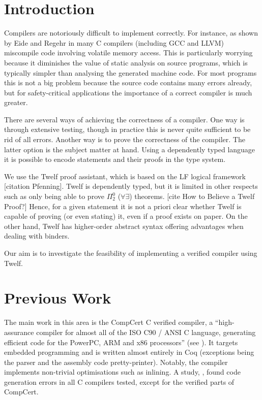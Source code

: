 \section{Introduction}
Compilers are notoriously difficult to implement correctly.
For instance, as shown by Eide and Regehr in \cite{EideRegehr08} many C compilers (including GCC and LLVM) miscompile code involving volatile memory access.
This is particularly worrying because it diminishes the value of static analysis on source programs, which is typically simpler than analysing the generated machine code.
For most programs this is not a big problem because the source code contains many errors already, but for safety-critical applications the importance of a correct compiler is much greater.

There are several ways of achieving the correctness of a compiler.
One way is through extensive testing, though in practice this is never quite sufficient to be rid of all errors.
Another way is to prove the correctness of the compiler.
The latter option is the subject matter at hand.
Using a dependently typed language it is possible to encode statements and their proofs in the type system.

We use the Twelf proof assistant, which is based on the LF logical framework [citation Pfenning].
Twelf is dependently typed, but it is limited in other respects such as only being able to prove $\Pi_2^0$ ($\forall \exists$) theorems. [cite How to Believe a Twelf Proof?]
Hence, for a given statement it is not a priori clear whether Twelf is capable of proving (or even stating) it, even if a proof exists on paper.
On the other hand, Twelf has higher-order abstract syntax offering advantages when dealing with binders.

Our aim is to investigate the feasibility of implementing a verified compiler using Twelf.


\section{Previous Work}

The main work in this area is the CompCert C verified compiler, a ``high-assurance compiler for almost all of the ISO C90 / ANSI C language, generating efficient code for the PowerPC, ARM and x86 processors'' (see \cite{CompCert16}).
It targets embedded programming and is written almost entirely in Coq (exceptions being the parser and the assembly code pretty-printer).
Notably, the compiler implements non-trivial optimisations such as inlining.
A study, \cite{Yang11}, found code generation errors in all C compilers tested, except for the verified parts of CompCert.

